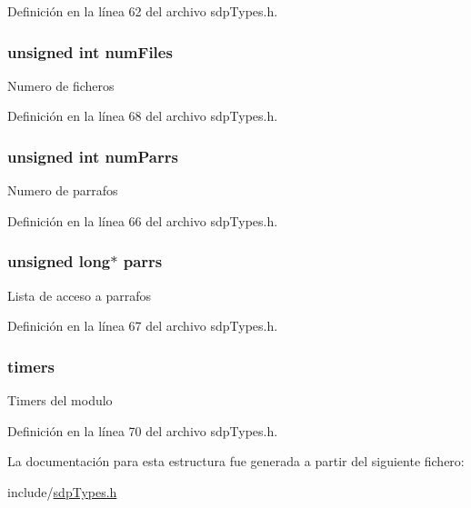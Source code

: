 Definición en la línea 62 del archivo sdp\+Types.\+h.

\hypertarget{struct_s_t___m_o_d_a9dbd5dd0bbfa51a355303896a2f70f76}{}
\subsubsection[{num\+Files}]{\setlength{\rightskip}{0pt plus 5cm}unsigned int num\+Files}\label{struct_s_t___m_o_d_a9dbd5dd0bbfa51a355303896a2f70f76}
Numero de ficheros 

Definición en la línea 68 del archivo sdp\+Types.\+h.

\hypertarget{struct_s_t___m_o_d_ab769f67b1f859e497d6476cf44f4e02d}{}
\subsubsection[{num\+Parrs}]{\setlength{\rightskip}{0pt plus 5cm}unsigned int num\+Parrs}\label{struct_s_t___m_o_d_ab769f67b1f859e497d6476cf44f4e02d}
Numero de parrafos 

Definición en la línea 66 del archivo sdp\+Types.\+h.

\hypertarget{struct_s_t___m_o_d_abc198cd7e81f42b66805a17af197de12}{}
\subsubsection[{parrs}]{\setlength{\rightskip}{0pt plus 5cm}unsigned long$\ast$ parrs}\label{struct_s_t___m_o_d_abc198cd7e81f42b66805a17af197de12}
Lista de acceso a parrafos 

Definición en la línea 67 del archivo sdp\+Types.\+h.

\hypertarget{struct_s_t___m_o_d_a90cdafff165917e473b00614b8fb8c18}{}
\subsubsection[{timers}]{ timers}\label{struct_s_t___m_o_d_a90cdafff165917e473b00614b8fb8c18}
Timers del modulo 

Definición en la línea 70 del archivo sdp\+Types.\+h.



La documentación para esta estructura fue generada a partir del siguiente fichero\+:\begin{DoxyCompactItemize}
\item 
include/\hyperlink{sdp_types_8h}{sdp\+Types.\+h}\end{DoxyCompactItemize}
